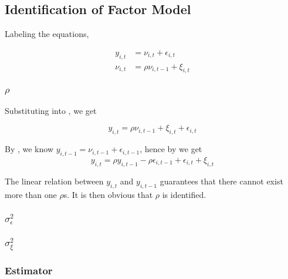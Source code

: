 \subsection{Identification of Factor Model}

Labeling the equations,

\begin{subequations}
    \begin{align}
        y_{i,t} &= \nu_{i,t} + \epsilon_{i,t} \label{eq:y-it} \\
        \nu_{i,t} &= \rho \nu_{i,t-1} + \xi_{i,t} \label{eq:nu-it}
    \end{align}
\end{subequations}

\subsubsection{$\rho$}

Substituting  into , we get 

\begin{equation}
    y_{i,t} = \rho \nu_{i,t-1} + \xi_{i,t}  + \epsilon_{i,t} \label{eq:y_t-1_nu}
\end{equation}

By , we know $y_{i,t-1} = \nu_{i,t-1} + \epsilon_{i,t-1}$, hence by  we get 
\begin{equation}
    y_{i,t} = \rho y_{i,t-1} - \rho \epsilon_{i,t-1} + \epsilon_{i,t} + \xi_{i,t}
\end{equation}

The linear relation between $y_{i,t}$ and $y_{i,t-1}$ guarantees that there cannot exist more than one $\rho$s. It is then obvious that $\rho$ is identified.

\subsubsection{$\sigma_\epsilon^2$}

\subsubsection{$\sigma_\xi^2$}

\subsubsection{Estimator}